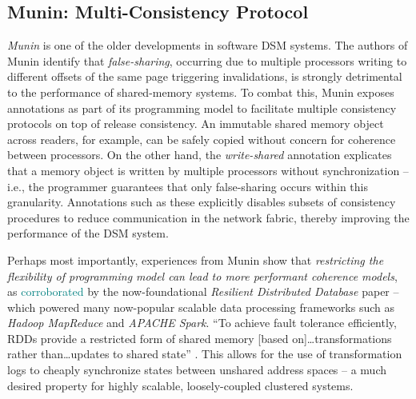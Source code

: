 \documentclass{article}
\begin{document}

\subsection{Munin: Multi-Consistency Protocol}
\textit{Munin}\cite{Carter_Bennett_Zwaenepoel.Munin.1991} is one of the older
developments in software DSM systems. The authors of Munin identify that
\textit{false-sharing}, occurring due to multiple processors writing to different
offsets of the same page triggering invalidations, is strongly detrimental to the
performance of shared-memory systems. To combat this, Munin exposes annotations
as part of its programming model to facilitate multiple consistency protocols on
top of release consistency. An immutable shared memory object across readers,
for example, can be safely copied without concern for coherence between processors.
On the other hand, the \textit{write-shared} annotation explicates that a memory
object is written by multiple processors without synchronization -- i.e., the
programmer guarantees that only false-sharing occurs within this granularity.
Annotations such as these explicitly disables subsets of consistency procedures
to reduce communication in the network fabric, thereby improving the performance
of the DSM system.

Perhaps most importantly, experiences from Munin show that \emph{restricting the
flexibility of programming model can lead to more performant coherence models}, as
\textcolor{teal}{corroborated} by the now-foundational
\textit{Resilient Distributed Database} paper \cite{Zaharia_etal.RDD.2012} --
which powered many now-popular scalable data processing frameworks such as
\textit{Hadoop MapReduce}\cite{WEB.APACHE..Apache_Hadoop.2023} and
\textit{APACHE Spark}\cite{WEB.APACHE..Apache_Spark.2023}. ``To achieve fault
tolerance efficiently, RDDs provide a restricted form of shared memory
[based on]\dots transformations rather than\dots updates to shared state''
\cite{Zaharia_etal.RDD.2012}. This allows for the use of transformation logs to
cheaply synchronize states between unshared address spaces -- a much desired
property for highly scalable, loosely-coupled clustered systems.
\end{document}
